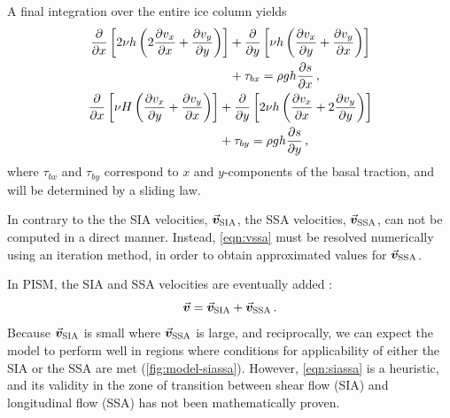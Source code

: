 \documentclass[a4paper]{kappa}
\newcommand{\vect}[1]{\va*{#1}} %
\newcommand{\vv}[0]{\vect{v}}           %
\newcommand{\vsia}[0]{\vv_{\mathrm{SIA}}}   %
\newcommand{\vssa}[0]{\vv_{\mathrm{SSA}}}   %
\begin{document}
A final integration over the entire ice column yields
\citep[Eqs.~7.7--7.8]{Weis.etal.1999}
\begin{subequations}
\begin{gather}
  \label{eqn:vssa}
  \begin{split}
    \pdv{x} \left[2\relax{\nu}h
                  \left(2\pdv{v_x}{x} + \pdv{v_y}{y}\right) \right]
        &+ \pdv{y} \left[\relax{\nu}h
                         \left(\pdv{v_x}{y} + \pdv{v_y}{x}\right) \right] \\
        &+ \tau_{bx} = \rho gh \pdv{s}{x} \,,
  \end{split}\\
  \begin{split}
    \pdv{x} \left[\relax{\nu}H
                  \left(\pdv{v_x}{y} + \pdv{v_y}{x}\right) \right]
        &+ \pdv{y} \left[2\relax{\nu}h
                         \left(\pdv{v_x}{x} + 2\pdv{v_y}{y}\right) \right] \\
        &+ \tau_{by} = \rho gh \pdv{s}{y} \,,
  \end{split}
\end{gather}
\end{subequations}
where $\tau_{bx}$ and $\tau_{by}$ correspond to $x$ and $y$-components of the
basal traction, and will be determined by a sliding law.

In contrary to the the SIA velocities, $\vsia$, the SSA velocities, $\vssa$,
can not be computed in a direct manner. Instead, \cref{eqn:vssa} must be
resolved numerically using an iteration method, in order to obtain
approximated values for $\vssa$.

In PISM, the SIA and SSA velocities are eventually added
\citep[\cref{fig:model-siassa};][Eq.~15]{Winkelmann.etal.2011}:
\begin{equation}
    \label{eqn:siassa}
    \vv = \vsia + \vssa \,.
\end{equation}
Because $\vsia$ is small where $\vssa$ is large, and
reciprocally, we can expect the model to perform well in regions where
conditions for applicability of either the SIA or the SSA are met
(\cref{fig:model-siassa}). However,
\cref{eqn:siassa} is a heuristic, and its validity in the zone of
transition between shear flow (SIA) and longitudinal flow (SSA) has not been
mathematically proven.
\end{document}
